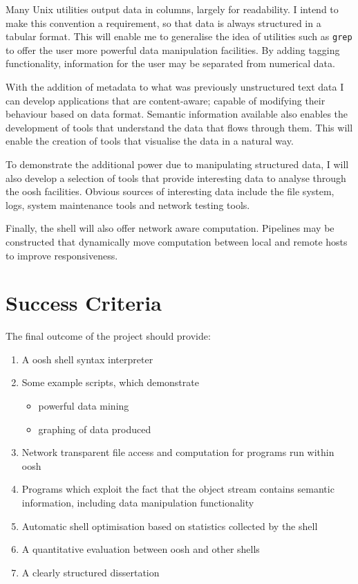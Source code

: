 \documentclass[12pt]{article}
\begin{document}
Many Unix utilities output data in columns, largely for readability. I
intend to make this convention a requirement, so that data is always
structured in a tabular format. This will enable me to generalise the
idea of utilities such as \texttt{grep} to offer the user more
powerful data manipulation facilities. By adding tagging functionality,
information for the user may be separated from numerical data.

With the addition of metadata to what was previously unstructured text
data I can develop applications that are content-aware; capable of
modifying their behaviour based on data format. Semantic information
available also enables the development of tools that understand the
data that flows through them. This will enable the creation of tools
that visualise the data in a natural way.

To demonstrate the additional power due to manipulating structured
data, I will also develop a selection of tools that provide
interesting data to analyse through the oosh facilities. Obvious
sources of interesting data include the file system, logs, system
maintenance tools and network testing tools.

Finally, the shell will also offer network aware
computation. Pipelines may be constructed that dynamically move
computation between local and remote hosts to improve responsiveness.

\section*{Success Criteria}
The final outcome of the project should provide:

\begin{enumerate}
\item A oosh shell syntax interpreter
\item Some example scripts, which demonstrate
  \begin{itemize}
  \item powerful data mining
  \item graphing of data produced
  \end{itemize}
\item Network transparent file access and computation for programs
  run within oosh
\item Programs which exploit the fact that the object stream contains
  semantic information, including data manipulation functionality
\item Automatic shell optimisation based on statistics collected by
  the shell
\item A quantitative evaluation between oosh and other shells
\item A clearly structured dissertation
\end{enumerate}
\end{document}
